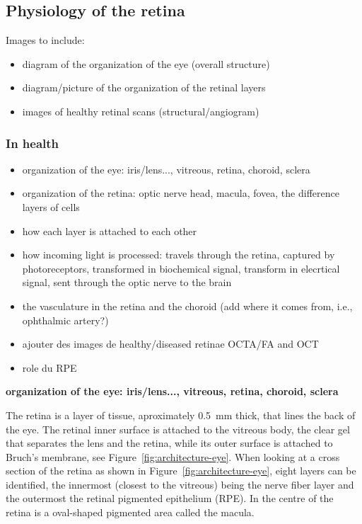 \documentclass[12pt,a4paper]{journal}
\begin{document}
\subsection{Physiology of the retina}

Images to include:
\begin{itemize}
\item diagram of the organization of the eye (overall structure)
\item diagram/picture of the organization of the retinal layers
\item images of healthy retinal scans (structural/angiogram)
\end{itemize}

\subsubsection{In health}

\begin{itemize}
\item organization of the eye: iris/lens..., vitreous, retina, choroid, sclera
\item organization of the retina: optic nerve head, macula, fovea, the difference layers of cells
\item how each layer is attached to each other
\item how incoming light is processed: travels through the retina, captured by photoreceptors, transformed in biochemical signal, transform in elecrtical signal, sent through the optic nerve to the brain
\item the vasculature in the retina and the choroid (add where it comes from, i.e., ophthalmic artery?)
\item ajouter des images de healthy/diseased retinae OCTA/FA and OCT
\item role du RPE
\end{itemize}

\large\textbf{organization of the eye: iris/lens..., vitreous, retina, choroid, sclera}

The retina is a layer of tissue, aproximately \SI{0.5}{\mm} thick, that lines the back of the eye.
The retinal inner surface is attached to the vitreous body, the clear gel that separates the lens and the retina, while its outer surface is attached to Bruch's membrane, see Figure~\ref{fig:architecture-eye}.
When looking at a cross section of the retina as shown in Figure~\ref{fig:architecture-eye}, eight layers can be identified, the innermost (closest to the vitreous) being the nerve fiber layer and the outermost the retinal pigmented epithelium (RPE).
In the centre of the retina is a oval-shaped pigmented area called the macula.
\end{document}
